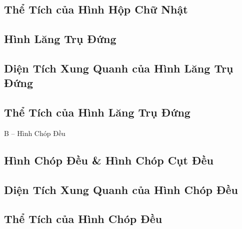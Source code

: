 \documentclass{article}
\numberwithin{equation}{section}
\begin{document}

\subsection{Thể Tích của Hình Hộp Chữ Nhật}


\subsection{Hình Lăng Trụ Đứng}


\subsection{Diện Tích Xung Quanh của Hình Lăng Trụ Đứng}


\subsection{Thể Tích của Hình Lăng Trụ Đứng}


\begin{center}
	\Large B -- Hình Chóp Đều
\end{center}

\subsection{Hình Chóp Đều \& Hình Chóp Cụt Đều}


\subsection{Diện Tích Xung Quanh của Hình Chóp Đều}


\subsection{Thể Tích của Hình Chóp Đều}


\printbibliography[heading=bibintoc]
	
\end{document}
